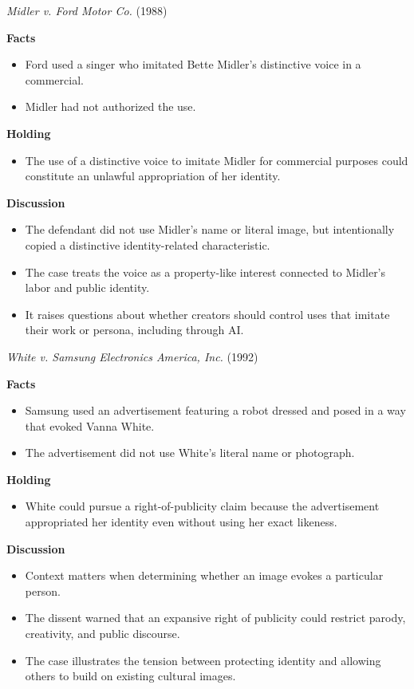 \documentclass[11pt]{tex/lawoutline}
\begin{document}
\casebox
{\textit{Midler v. Ford Motor Co.} (1988)}
{}
{
\textbf{Facts}
\begin{itemize}
    \item Ford used a singer who imitated Bette Midler's distinctive voice in a commercial.
    \item Midler had not authorized the use.
\end{itemize}

\textbf{Holding}
\begin{itemize}
    \item The use of a distinctive voice to imitate Midler for commercial purposes could constitute an unlawful appropriation of her identity.
\end{itemize}

\textbf{Discussion}
\begin{itemize}
    \item The defendant did not use Midler's name or literal image, but intentionally copied a distinctive identity-related characteristic.
    \item The case treats the voice as a property-like interest connected to Midler's labor and public identity.
    \item It raises questions about whether creators should control uses that imitate their work or persona, including through AI.
\end{itemize}
}

\casebox
{\textit{White v. Samsung Electronics America, Inc.} (1992)}
{}
{
\textbf{Facts}
\begin{itemize}
    \item Samsung used an advertisement featuring a robot dressed and posed in a way that evoked Vanna White.
    \item The advertisement did not use White's literal name or photograph.
\end{itemize}

\textbf{Holding}
\begin{itemize}
    \item White could pursue a right-of-publicity claim because the advertisement appropriated her identity even without using her exact likeness.
\end{itemize}

\textbf{Discussion}
\begin{itemize}
    \item Context matters when determining whether an image evokes a particular person.
    \item The dissent warned that an expansive right of publicity could restrict parody, creativity, and public discourse.
    \item The case illustrates the tension between protecting identity and allowing others to build on existing cultural images.
\end{itemize}
}
\end{document}
